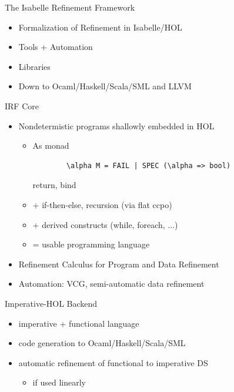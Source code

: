 \documentclass[fleqn]{beamer}
\begin{document}
\begin{frame}{The Isabelle Refinement Framework}
  \begin{itemize}
   \item<+-> Formalization of Refinement in Isabelle/HOL
   \item<+-> Tools + Automation
   \item<+-> Libraries
   \item<+-> Down to Ocaml/Haskell/Scala/SML and LLVM

  \end{itemize}
\end{frame}
\begin{frame}[fragile]{IRF Core}
  \begin{itemize}
   \item<+-> Nondetermistic programs shallowly embedded in HOL
    \begin{itemize}
     \item As monad
      \begin{lstlisting}
        \alpha M = FAIL | SPEC (\alpha => bool)
      \end{lstlisting}
      return, bind
     \item<+-> + if-then-else, recursion (via flat ccpo)
     \item<+-> + derived constructs (while, foreach, ...)
     \item<+-> = usable programming language
    \end{itemize}
   \item<+-> Refinement Calculus for Program and Data Refinement
   \item<+-> Automation: VCG, semi-automatic data refinement

  \end{itemize}
\end{frame}
\begin{frame}{Imperative-HOL Backend}
  \begin{itemize}
   \item imperative + functional language
   \item code generation to Ocaml/Haskell/Scala/SML
   \item automatic refinement of functional to imperative DS
    \begin{itemize}
     \item if used linearly

    \end{itemize}
  \end{itemize}
\end{frame}
\end{document}
